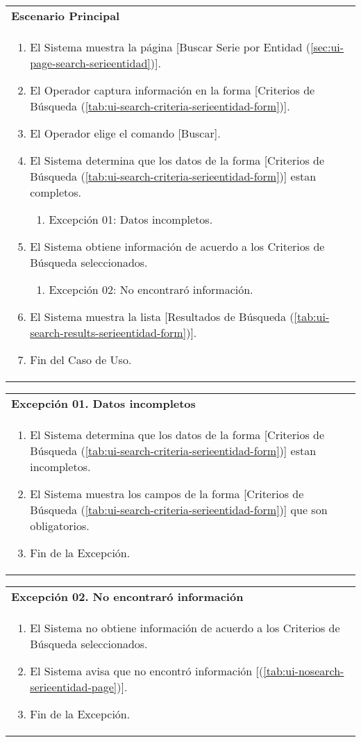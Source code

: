 \begin{tabular}{ p{15.5cm} }
	\textbf{Escenario Principal} \\
	\begin{enumerate}
		\item El Sistema muestra la página [Buscar Serie por Entidad (\ref{sec:ui-page-search-serieentidad})].
		\item El Operador captura información en la forma [Criterios de Búsqueda (\ref{tab:ui-search-criteria-serieentidad-form})].
		\item El Operador elige el comando [Buscar].
		\item El Sistema determina que los datos de la forma [Criterios de Búsqueda (\ref{tab:ui-search-criteria-serieentidad-form})] estan completos.
			\begin{enumerate}
				\item Excepción 01: Datos incompletos.
			\end{enumerate}
		\item El Sistema obtiene información de acuerdo a los Criterios de Búsqueda seleccionados.
			\begin{enumerate}
				\item Excepción 02: No encontraró información.
			\end{enumerate}
		\item El Sistema muestra la lista [Resultados de Búsqueda (\ref{tab:ui-search-results-serieentidad-form})].
		\item Fin del Caso de Uso.
	\end{enumerate}
\end{tabular}

\begin{tabular}{ p{15.5cm} }
	\textbf{Excepción 01. Datos incompletos} \\
	\begin{enumerate}
		\item El Sistema determina que los datos de la forma [Criterios de Búsqueda (\ref{tab:ui-search-criteria-serieentidad-form})] estan incompletos.
		\item El Sistema muestra los campos de la forma [Criterios de Búsqueda (\ref{tab:ui-search-criteria-serieentidad-form})] que son obligatorios.
		\item Fin de la Excepción.
	\end{enumerate}
\end{tabular}

\begin{tabular}{ p{15.5cm} }
	\textbf{Excepción 02. No encontraró información} \\
	\begin{enumerate}
		\item El Sistema no obtiene información de acuerdo a los Criterios de Búsqueda seleccionados.
		\item El Sistema avisa que no encontró información [(\ref{tab:ui-nosearch-serieentidad-page})].
		\item Fin de la Excepción.
	\end{enumerate}
\end{tabular}


